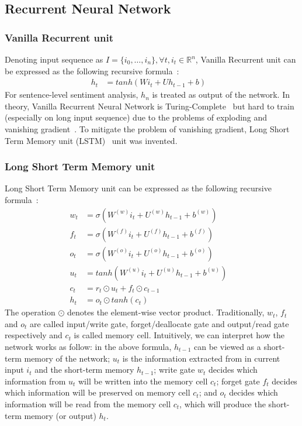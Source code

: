 \subsection{Recurrent Neural Network}
\subsubsection{Vanilla Recurrent unit}\label{sec:vanilla-rnn}
Denoting input sequence as \(I = \{i_0,\ldots,i_n\}, \forall t, i_t \in \mathbb{R}^n\), Vanilla Recurrent unit can be expressed as the following recursive formula~\cite{treeLSTM}:
\begin{align}
h_t &= tanh(Wi_t + Uh_{t-1} + b)&
\end{align}
For sentence-level sentiment analysis, \(h_n\) is treated as output of the network.
In theory, Vanilla Recurrent Neural Network is Turing-Complete~\cite{rnn-turing-complete} but hard to train (especially on long input sequence) due to the problems of exploding and vanishing gradient~\cite{Bengio1994}.
To mitigate the problem of vanishing gradient, Long Short Term Memory unit (LSTM)~\cite{originLSTM} unit was invented.
\subsubsection{Long Short Term Memory unit}\label{sec:lstm}
Long Short Term Memory unit can be expressed as the following recursive formula~\cite{treeLSTM}:
\begin{align}
w_t &= \sigma\left(W^{(w)}i_t + U^{(w)}h_{t-1} + b^{(w)}\right) \label{eq:lstm-input-gate}&\\
f_t &= \sigma\left(W^{(f)}i_t + U^{(f)}h_{t-1} + b^{(f)}\right) \label{eq:lstm-forget-gate}&\\
o_t &= \sigma\left(W^{(o)}i_t + U^{(o)}h_{t-1} + b^{(o)}\right) \label{eq:lstm-output-gate}&\\
u_t &= tanh\left(W^{(u)}i_t + U^{(u)}h_{t-1} + b^{(u)}\right) \label{eq:lstm-update-gate}&\\
c_t &= r_t \odot u_t + f_t \odot c_{t-1} \label{eq:longterm-mem}&\\
h_t &= o_t \odot tanh(c_t) \label{eq:temperal-mem}&
\end{align}
The operation \(\odot\) denotes the element-wise vector product.
Traditionally, \(w_t\), \(f_t\) and \(o_t\) are called input/write gate, forget/deallocate gate and output/read gate respectively and \(c_t\) is called memory cell.
Intuitively, we can interpret how the network works as follow:
in the above formula, \(h_{t-1}\) can be viewed as a short-term memory of the network;
\(u_t\) is the information extracted from in current input \(i_t\) and the short-term memory \(h_{t-1}\);
write gate \(w_t\) decides which information from \(u_t\) will be written into the memory cell \(c_t\);
forget gate \(f_t\) decides which information will be preserved on memory cell \(c_t\);
and \(o_t\) decides which information will be read from the memory cell \(c_t\), which will produce the short-term memory (or output) \(h_t\).